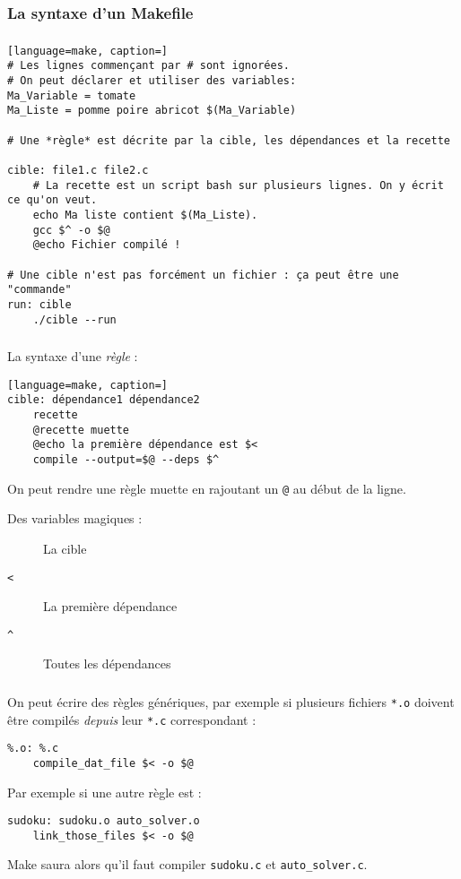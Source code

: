 \subsubsection{La syntaxe d'un Makefile}

\begin{frame}[fragile]
\frametitle{\insertsubsubsection}
\begin{lstlisting}[language=make, caption=]
# Les lignes commençant par # sont ignorées.
# On peut déclarer et utiliser des variables:
Ma_Variable = tomate
Ma_Liste = pomme poire abricot $(Ma_Variable)

# Une *règle* est décrite par la cible, les dépendances et la recette

cible: file1.c file2.c
    # La recette est un script bash sur plusieurs lignes. On y écrit ce qu'on veut.
    echo Ma liste contient $(Ma_Liste).
    gcc $^ -o $@
    @echo Fichier compilé !

# Une cible n'est pas forcément un fichier : ça peut être une "commande"
run: cible
    ./cible --run
\end{lstlisting}
\end{frame}
\begin{frame}[fragile]
\frametitle{\insertsubsubsection}
La syntaxe d'une \textit{règle} :
\begin{lstlisting}[language=make, caption=]
cible: dépendance1 dépendance2
    recette
    @recette muette
    @echo la première dépendance est $<
    compile --output=$@ --deps $^
\end{lstlisting}
\medskip
On peut rendre une règle muette en rajoutant un \texttt{@} au début de la ligne.

\bigskip
Des variables magiques :
\begin{description}
  \item[\texttt{\textdollar@}] La cible
  \item[\texttt{\textdollar<}] La première dépendance
  \item[\texttt{\textdollar\textasciicircum}] Toutes les dépendances
\end{description}

\end{frame}

\begin{frame}[fragile]
\frametitle{\insertsubsubsection}

On peut écrire des règles génériques, par exemple si plusieurs fichiers \texttt{*.o} doivent 
être compilés \textit{depuis} leur \texttt{*.c} correspondant :

\begin{lstlisting}
%.o: %.c
    compile_dat_file $< -o $@
\end{lstlisting}
\medskip
Par exemple si une autre règle est :
\begin{lstlisting}
sudoku: sudoku.o auto_solver.o
    link_those_files $< -o $@
\end{lstlisting}

Make saura alors qu'il faut compiler \texttt{sudoku.c} et \texttt{auto\_solver.c}.

\end{frame}

